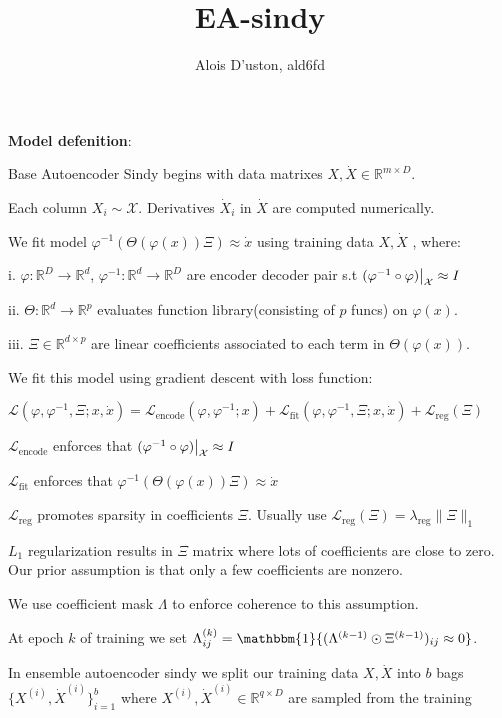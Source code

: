 \documentclass[11pt]{article}
\title{ EA-sindy}
\author{Alois D'uston,  ald6fd}
\newcommand{\indi}{\mathbbm{1}}
\newcommand{\R}{\mathbb{R}}
\newcommand{\tb}{\textbf}
\newcommand{\norm}[2]{\| #1 \|_{#2}}
\newcommand{\restrict}[2]{#1\big{|}_{#2}}
\newcommand{\func}[3]{#1: #2\rightarrow#3}
\begin{document}
\maketitle


\tb{Model defenition}:

Base Autoencoder Sindy begins with data matrixes $X,  \dot{X} \in \R^{m \times D}$. 

Each column $X_i \sim \mathcal{X}$.  Derivatives $\dot{X}_i$ in  $\dot{X}$ are computed numerically.  
 
We fit model $\varphi^{-1}(\Theta(\varphi(x))\Xi) \approx \dot{x}$  using training data $X,  \dot{X}$ , where:


i.  $\func{\varphi}{\R^D}{\R^d}$, $\func{\varphi^{-1}}{\R^d}{\R^D}$ are encoder decoder pair s.t  
$\restrict{(\varphi^{-1} \circ \varphi)}{\mathcal{X}} \approx  I$

ii.  $\func{\Theta}{\R^d}{\R^p}$ evaluates function library(consisting of $p$ funcs) on $\varphi(x)$.

iii.  $\Xi \in \R^{d \times p}$ are linear coefficients associated to each term in ${\Theta}(\varphi(x))$.

We fit this model using gradient descent with loss function:

$\mathcal{L}(\varphi, \varphi^{-1},  \Xi ; x ,\dot{x}) = \mathcal{L}_\text{encode}(\varphi, \varphi^{-1}; x) + \mathcal{L}_\text{fit}(\varphi, \varphi^{-1},\Xi; x,\dot{x}) + \mathcal{L}_\text{reg}(\Xi)$

 $\mathcal{L}_\text{encode}$ enforces that $\restrict{(\varphi^{-1} \circ \varphi)}{\mathcal{X}} \approx  I$
 
 $\mathcal{L}_\text{fit}$ enforces that $\varphi^{-1}(\Theta(\varphi(x))\Xi) \approx \dot{x}$

 $\mathcal{L}_\text{reg}$ promotes sparsity in  coefficients $\Xi$.
 Usually   use $\mathcal{L}_\text{reg}(\Xi) = \lambda_\text{reg}\norm{\Xi}{1}$
 
 $L_1$ regularization results in $\Xi$ matrix where lots of coefficients are close to zero.  Our prior assumption is that only a few coefficients are nonzero. 
 
  We use coefficient mask $\Lambda$ to enforce coherence to this assumption.  
 
 At epoch $k$ of training we set $\Lambda ^{(k)}_{ij} = \indi\{(\Lambda ^{(k-1)}\odot \Xi^{(k-1)})_{ij} \approx 0\}$.
 
 \pagebreak
 
 
 In ensemble autoencoder sindy we split our training data $X,\dot{X}$ 	into $b$ bags $\{X^{(i)},  \dot{X}^{(i)}\}_{i=1}^b$ where $X^{(i)},\dot{X}^{(i)} \in \R^{q \times D}$ are sampled from the training 
 
\end{document}
